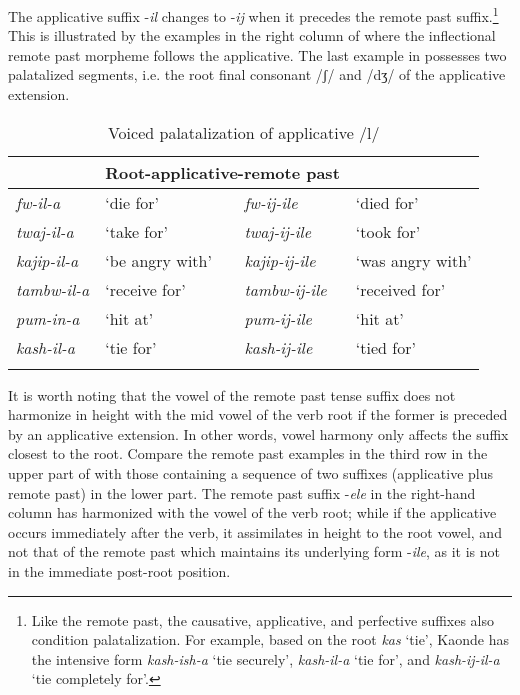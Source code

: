 \documentclass[output=paper]{langsci/langscibook}
\begin{document}
The applicative suffix -\textit{il} changes to -\textit{ij} when it precedes the remote past suffix.\footnote{Like the remote past, the causative, applicative, and perfective suffixes also condition palatalization. For example, based on the root \textit{kas} ‘tie’, Kaonde has the intensive form \textit{kash-ish-a} ‘tie securely’, \textit{kash-il-a} ‘tie for’, and \textit{kash-ij-il-a} ‘tie completely for’.} This is illustrated by the examples in the right column of  where the inflectional remote past morpheme follows the applicative. The last example in  possesses two palatalized segments, i.e. the root final consonant /ʃ/ and /dʒ/ of the applicative extension. 


\begin{table} 
\begin{tabularx}{\textwidth}{lXlX}
\lsptoprule
\multicolumn{2}{l}{Root-applicative-\textsc{fv}}  & \multicolumn{2}{l}{Root-applicative-remote past}\\
\midrule
\textit{fw-il-a} & `die for' & \textit{fw-ij-ile} & `died for' \\
\textit{twaj-il-a} & `take for' & \textit{twaj-ij-ile} & `took for' \\
\textit{kajip-il-a} & `be angry with' & \textit{kajip-ij-ile} & `was angry with' \\
\textit{tambw-il-a} & `receive for' & \textit{tambw-ij-ile} & `received for' \\
\textit{pum-in-a} & `hit at' & \textit{pum-ij-ile} & `hit at' \\
\textit{kash-il-a} & `tie for' & \textit{kash-ij-ile} & `tied for' \\

\lspbottomrule
\end{tabularx} 

\caption{Voiced palatalization of applicative /l/}
\label{tab:13.kawasha}
\end{table}

It is worth noting that the vowel of the remote past tense suffix does not harmonize in height with the mid vowel of the verb root if the former is preceded by an applicative extension. In other words, vowel harmony only affects the suffix closest to the root. Compare the remote past examples in the third row in the upper part of  with those containing a sequence of two suffixes (applicative plus remote past) in the lower part. The remote past suffix -\textit{ele} in the right-hand column has harmonized with the vowel of the verb root; while if the applicative occurs immediately after the verb, it assimilates in height to the root  vowel, and not that of the remote past which maintains its underlying form -\textit{ile}, as it is not in the immediate post-root position.
 
\end{document}
